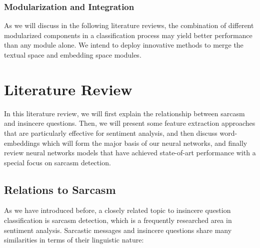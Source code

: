 \documentclass[12pt]{diazessay} %
\begin{document}
\subsubsection{Modularization and Integration}

As we will discuss in the following literature reviews, the combination of different modularized components in a classification process may yield better performance than any module alone. We intend to deploy innovative methods to merge the textual space and embedding space modules. 

\section{Literature Review}

In this literature review, we will first explain the relationship between sarcasm and insincere questions. Then, we will present some feature extraction approaches that are particularly effective for sentiment analysis, and then discuss word-embeddings which will form the major basis of our neural networks, and finally review neural networks models that have achieved state-of-art performance with a special focus on sarcasm detection. 

\subsection{Relations to Sarcasm}

As we have introduced before, a closely related topic to insincere question classification is sarcasm detection, which is a frequently researched area in sentiment analysis\citep{joshi2017}. Sarcastic messages and insincere questions share many similarities in terms of their linguistic nature:
\end{document}
